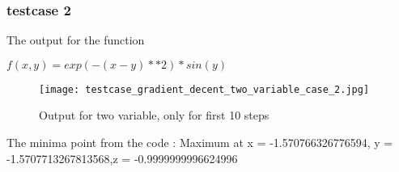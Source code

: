 \documentclass[titlepage, 11pt]{article}
\begin{document}
\subsubsection{testcase 2}

The output for the function \\
\begin{center}
    $f(x,y) = exp(-(x - y)**2)*sin(y)$
\end{center}
\begin{figure}[ht]
    \centering
    \texttt{[image: testcase\_gradient\_decent\_two\_variable\_case\_2.jpg]}
    \caption{Output for two variable, only for first 10 steps}
    \label{fig:Output for two variable}
\end{figure}
The minima point from the code : 
Maximum at x = -1.570766326776594, y = -1.5707713267813568,z
 = -0.9999999996624996




% 
% 
\end{document}
